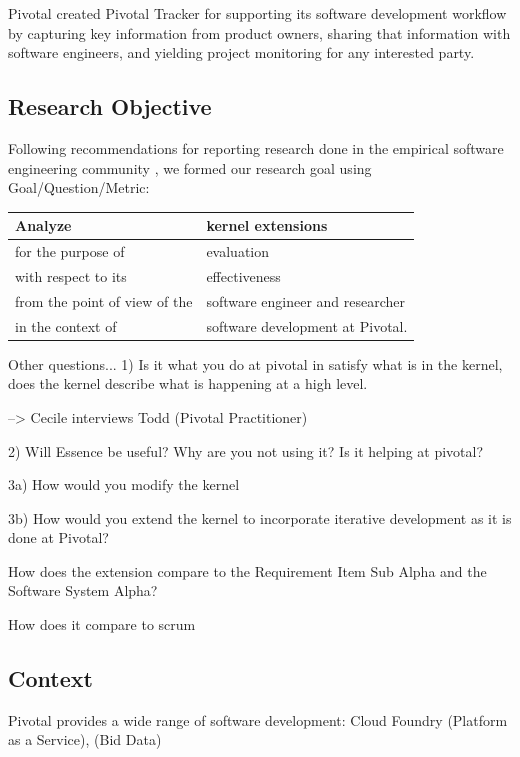 \documentclass[preprint,12pt,3p]{elsarticle}
\begin{document}
Pivotal created Pivotal Tracker for supporting its software development workflow by capturing key information from product owners, sharing that information with software engineers, and yielding project monitoring for any interested party.

\subsection{Research Objective}
Following recommendations for reporting research done in the empirical
software engineering community
\cite{GQM, Shaw}, we formed our
research goal using Goal/Question/Metric:
\cite{GQM}

\begin{table}[h]
\centering
\begin{tabular}{|p{1.00in}|p{2.10in}|}
\hline
Analyze & kernel extensions \\ \hline
for the purpose of & evaluation \\ \hline
with respect to its & effectiveness \\ \hline
from the point of view of the & software engineer and researcher \\ \hline
in the context of & software development at Pivotal. \\
\hline
\end{tabular}
\end{table}

Other questions...
1) Is it what you do at pivotal in satisfy what is in the kernel, does the kernel describe what is happening at a high level. 

--> Cecile interviews Todd (Pivotal Practitioner)

2) Will Essence be useful? Why are you not using it? Is it helping at pivotal? 

3a) How would you modify the kernel 

3b) How would you extend the kernel to incorporate iterative development as it is done at Pivotal?

How does the extension compare to the Requirement Item Sub Alpha and the Software System Alpha? 

How does it compare to scrum


\subsection{Context}
Pivotal provides a wide range of software development: Cloud Foundry (Platform as a Service),  (Bid Data)
\end{document}
